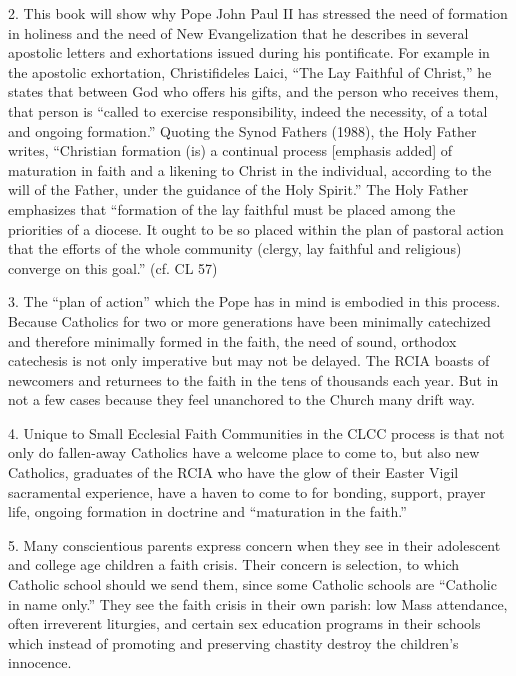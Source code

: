 \documentclass[oneside]{book}
\begin{document}
2. This book will show why Pope John Paul II has stressed the need of formation
in holiness and the need of New Evangelization that he describes in several
apostolic letters and exhortations issued during his pontificate. For example in
the apostolic exhortation, Christifideles Laici, ``The Lay Faithful of Christ,''
he states that between God who offers his gifts, and the person who receives
them, that person is ``called to exercise responsibility, indeed the necessity,
of a total and ongoing formation.'' Quoting the Synod Fathers (1988), the Holy
Father writes, ``Christian formation (is) a continual process [emphasis added]
of maturation in faith and a likening to Christ in the individual, according to
the will of the Father, under the guidance of the Holy Spirit.'' The Holy Father
emphasizes that ``formation of the lay faithful must be placed among the
priorities of a diocese. It ought to be so placed within the plan of pastoral
action that the efforts of the whole community (clergy, lay faithful and
religious) converge on this goal.'' (cf. CL 57)

3. The ``plan of action'' which the Pope has in mind is embodied in this
process. Because Catholics for two or more generations have been minimally
catechized and therefore minimally formed in the faith, the need of sound,
orthodox catechesis is not only imperative but may not be delayed. The RCIA
boasts of newcomers and returnees to the faith in the tens of thousands each
year. But in not a few cases because they feel unanchored to the Church many
drift way.

4. Unique to Small Ecclesial Faith Communities in the CLCC process is that not
only do fallen-away Catholics have a welcome place to come to, but also new
Catholics, graduates of the RCIA who have the glow of their Easter Vigil
sacramental experience, have a haven to come to for bonding, support, prayer
life, ongoing formation in doctrine and ``maturation in the faith.''

5. Many conscientious parents express concern when they see in their adolescent
and college age children a faith crisis. Their concern is selection, to which
Catholic school should we send them, since some Catholic schools are ``Catholic
in name only.'' They see the faith crisis in their own parish: low Mass
attendance, often irreverent liturgies, and certain sex education programs in
their schools which instead of promoting and preserving chastity destroy the
children's innocence.
\end{document}
